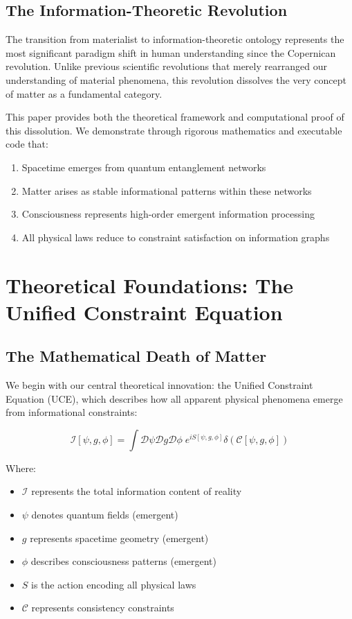 \documentclass[12pt]{article}
\begin{document}
\subsection{The Information-Theoretic Revolution}

The transition from materialist to information-theoretic ontology represents the most significant paradigm shift in human understanding since the Copernican revolution. Unlike previous scientific revolutions that merely rearranged our understanding of material phenomena, this revolution dissolves the very concept of matter as a fundamental category.

This paper provides both the theoretical framework and computational proof of this dissolution. We demonstrate through rigorous mathematics and executable code that:

\begin{enumerate}
\item Spacetime emerges from quantum entanglement networks
\item Matter arises as stable informational patterns within these networks
\item Consciousness represents high-order emergent information processing
\item All physical laws reduce to constraint satisfaction on information graphs
\end{enumerate}

\section{Theoretical Foundations: The Unified Constraint Equation}

\subsection{The Mathematical Death of Matter}

We begin with our central theoretical innovation: the Unified Constraint Equation (UCE), which describes how all apparent physical phenomena emerge from informational constraints:

\begin{equation}
\mathcal{I}[\psi, g, \phi] = \int \mathcal{D}\psi \mathcal{D}g \mathcal{D}\phi \; e^{i S[\psi, g, \phi]} \delta(\mathcal{C}[\psi, g, \phi])
\end{equation}

Where:
\begin{itemize}
\item $\mathcal{I}$ represents the total information content of reality
\item $\psi$ denotes quantum fields (emergent)
\item $g$ represents spacetime geometry (emergent)
\item $\phi$ describes consciousness patterns (emergent)
\item $S$ is the action encoding all physical laws
\item $\mathcal{C}$ represents consistency constraints
\end{itemize}
\end{document}
